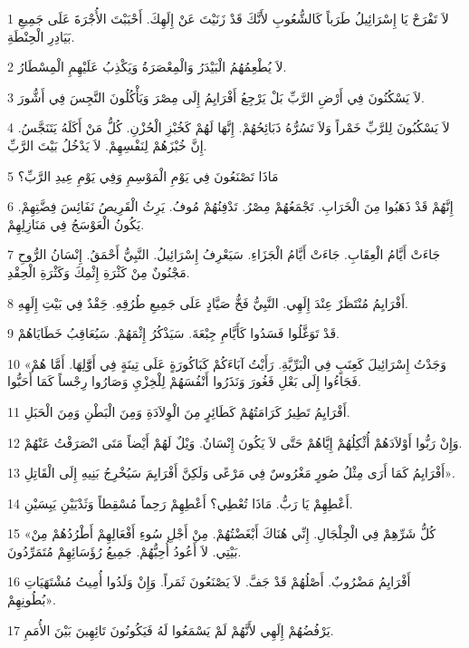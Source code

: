 \par 1 لاَ تَفْرَحْ يَا إِسْرَائِيلُ طَرَباً كَالشُّعُوبِ لأَنَّكَ قَدْ زَنَيْتَ عَنْ إِلَهِكَ. أَحْبَبْتَ الأُجْرَةَ عَلَى جَمِيعِ بَيَادِرِ الْحِنْطَةِ.
\par 2 لاَ يُطْعِمُهُمُ الْبَيْدَرُ وَالْمِعْصَرَةُ وَيَكْذِبُ عَلَيْهِمِ الْمِسْطَارُ.
\par 3 لاَ يَسْكُنُونَ فِي أَرْضِ الرَّبِّ بَلْ يَرْجِعُ أَفْرَايِمُ إِلَى مِصْرَ وَيَأْكُلُونَ النَّجِسَ فِي أَشُّورَ.
\par 4 لاَ يَسْكُبُونَ لِلرَّبِّ خَمْراً وَلاَ تَسُرُّهُ ذَبَائِحُهُمْ. إِنَّهَا لَهُمْ كَخُبْزِ الْحُزْنِ. كُلُّ مَنْ أَكَلَهُ يَتَنَجَّسُ. إِنَّ خُبْزَهُمْ لِنَفْسِهِمْ. لاَ يَدْخُلُ بَيْتَ الرَّبِّ.
\par 5 مَاذَا تَصْنَعُونَ فِي يَوْمِ الْمَوْسِمِ وَفِي يَوْمِ عِيدِ الرَّبِّ؟
\par 6 إِنَّهُمْ قَدْ ذَهَبُوا مِنَ الْخَرَابِ. تَجْمَعُهُمْ مِصْرُ. تَدْفِنُهُمْ مُوفُ. يَرِثُ الْقَرِيصُ نَفَائِسَ فِضَّتِهِمْ. يَكُونُ الْعَوْسَجُ فِي مَنَازِلِهِمْ.
\par 7 جَاءَتْ أَيَّامُ الْعِقَابِ. جَاءَتْ أَيَّامُ الْجَزَاءِ. سَيَعْرِفُ إِسْرَائِيلُ. النَّبِيُّ أَحْمَقُ. إِنْسَانُ الرُّوحِ مَجْنُونٌ مِنْ كَثْرَةِ إِثْمِكَ وَكَثْرَةِ الْحِقْدِ.
\par 8 أَفْرَايِمُ مُنْتَظَرٌ عِنْدَ إِلَهِي. النَّبِيُّ فَخُّ صَيَّادٍ عَلَى جَمِيعِ طُرُقِهِ. حَِقْدٌ فِي بَيْتِ إِلَهِهِ.
\par 9 قَدْ تَوَغَّلُوا فَسَدُوا كَأَيَّامِ جِبْعَةَ. سَيَذْكُرُ إِثْمَهُمْ. سَيُعَاقِبُ خَطَايَاهُمْ.
\par 10 «وَجَدْتُ إِسْرَائِيلَ كَعِنَبٍ فِي الْبَرِّيَّةِ. رَأَيْتُ آبَاءَكُمْ كَبَاكُورَةٍ عَلَى تِينَةٍ فِي أَوَّّلِهَا. أَمَّا هُمْ فَجَاءُوا إِلَى بَعْلِ فَغُورَ وَنَذَرُوا أَنْفُسَهُمْ لِلْخِزْيِ وَصَارُوا رِجْساً كَمَا أَحَبُّوا.
\par 11 أَفْرَايِمُ تَطِيرُ كَرَامَتُهُمْ كَطَائِرٍ مِنَ الْوِلاَدَةِ وَمِنَ الْبَطْنِ وَمِنَ الْحَبَلِ.
\par 12 وَإِنْ رَبُّوا أَوْلاَدَهُمْ أُثْكِلُهُمْ إِيَّاهُمْ حَتَّى لاَ يَكُونَ إِنْسَانٌ. وَيْلٌ لَهُمْ أَيْضاً مَتَى انْصَرَفْتُ عَنْهُمْ.
\par 13 أَفْرَايِمُ كَمَا أَرَى مِثْلُ صُورٍ مَغْرُوسٌ فِي مَرْعًى وَلَكِنَّ أَفْرَايِمَ سَيُخْرِجُ بَنِيهِ إِلَى الْقَاتِلِ».
\par 14 أَعْطِهِمْ يَا رَبُّ. مَاذَا تُعْطِي؟ أَعْطِهِمْ رَحِماً مُسْقِطاً وَثَدْيَيْنِ يَبِسَيْنِ.
\par 15 «كُلُّ شَرِّهِمْ فِي الْجِلْجَالِ. إِنِّي هُنَاكَ أَبْغَضْتُهُمْ. مِنْ أَجْلِ سُوءِ أَفْعَالِهِمْ أَطْرُدُهُمْ مِنْ بَيْتِي. لاَ أَعُودُ أُحِبُّهُمْ. جَمِيعُ رُؤَسَائِهِمْ مُتَمَرِّدُونَ.
\par 16 أَفْرَايِمُ مَضْرُوبٌ. أَصْلُهُمْ قَدْ جَفَّ. لاَ يَصْنَعُونَ ثَمَراً. وَإِنْ وَلَدُوا أُمِيتُ مُشْتَهَيَاتِ بُطُونِهِمْ».
\par 17 يَرْفُضُهُمْ إِلَهِي لأَنَّهُمْ لَمْ يَسْمَعُوا لَهُ فَيَكُونُونَ تَائِهِينَ بَيْنَ الأُمَمِ.

